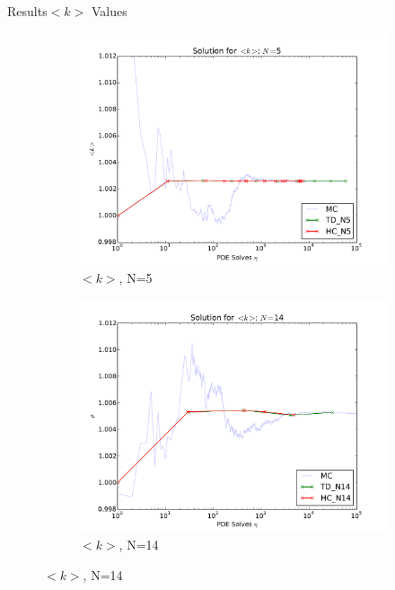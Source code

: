 \documentclass{beamer}
\begin{document}
\begin{frame}{Results}{$<k>$ Values}
  \begin{figure}[h!]
    \centering
    \begin{subfigure}[b]{0.49 \textwidth}
      \includegraphics[width=\textwidth]{../graphics/soln_5}
      \caption{$<k>$, N=5}
      \label{soln_5}
    \end{subfigure}
    \begin{subfigure}[b]{0.49 \textwidth}
      \includegraphics[width=\textwidth]{../graphics/soln_14}
      \caption{$<k>$, N=14}
      \label{soln_14}
    \end{subfigure}
  \end{figure}
\end{frame}
\end{document}
